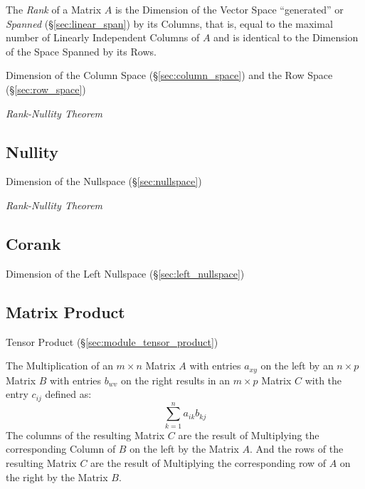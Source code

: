 The \emph{Rank} of a Matrix $A$ is the Dimension of the Vector Space
``generated'' or \emph{Spanned} (\S\ref{sec:linear_span}) by its Columns, that
is, equal to the maximal number of Linearly Independent Columns of $A$ and is
identical to the Dimension of the Space Spanned by its Rows.

Dimension of the Column Space (\S\ref{sec:column_space}) and the Row Space
(\S\ref{sec:row_space})

\emph{Rank-Nullity Theorem}



\subsection{Nullity}\label{sec:nullity}

Dimension of the Nullspace (\S\ref{sec:nullspace})

\emph{Rank-Nullity Theorem}



\subsection{Corank}\label{sec:corank}

Dimension of the Left Nullspace (\S\ref{sec:left_nullspace})



\subsection{Matrix Product}\label{sec:matrix_product}

\fist Tensor Product (\S\ref{sec:module_tensor_product})

The Multiplication of an $m \times n$ Matrix $A$ with entries $a_{xy}$
on the left by an $n \times p$ Matrix $B$ with entries $b_{wv}$ on the
right results in an $m \times p$ Matrix $C$ with the entry $c_{ij}$
defined as:
\[
  \sum_{k=1}^n a_{ik} b_{kj}
\]
The columns of the resulting Matrix $C$ are the result of Multiplying
the corresponding Column of $B$ on the left by the Matrix $A$. And the
rows of the resulting Matrix $C$ are the result of Multiplying the
corresponding row of $A$ on the right by the Matrix $B$.



